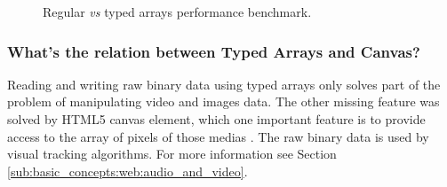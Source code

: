 \begin{figure}[!htb]
  \caption{Regular \textit{vs} typed arrays performance benchmark.}
  \label{figure:typed_arrays_performance}
\end{figure}


\subsubsection{What's the relation between Typed Arrays and Canvas?} %
\label{subsub:basic_concepts:web:javascript_typed_arrays:relation_between_typed_and_canvas}

Reading and writing raw binary data \cite{Canvas2013,TypedArray2013} using typed arrays only solves part of the problem of manipulating video and images data. The other missing feature was solved by HTML5 \cite{Hickson2013} canvas element, which one important feature is to provide access to the array of pixels of those medias \cite{Canvas2013,Hickson2013}. The raw binary data is used by visual tracking algorithms. For more information see Section \ref{sub:basic_concepts:web:audio_and_video}.

